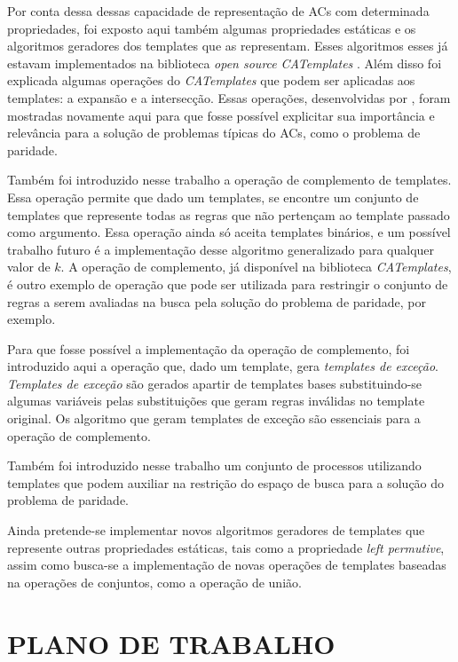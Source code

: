 \documentclass[12pt,a4paper]{article}
\let\stdsection\section
\renewcommand\section{\newpage\stdsection}
\begin{document}
Por conta dessa dessas capacidade de representação de ACs com determinada propriedades, foi exposto aqui também algumas propriedades estáticas e os algoritmos geradores dos templates que as representam. Esses algoritmos esses já estavam implementados na biblioteca \textit{open source} \textit{CATemplates} \cite{CATemplates}. Além disso foi explicada algumas operações do \textit{CATemplates} que podem ser aplicadas aos templates: a expansão e a intersecção. Essas operações, desenvolvidas por , foram mostradas novamente aqui para que fosse possível explicitar sua importância e relevância para a solução de problemas típicas do ACs, como o problema de paridade.

Também foi introduzido nesse trabalho a operação de complemento de templates. Essa operação permite que dado um templates, se encontre um conjunto de templates que represente todas as regras que não pertençam ao template passado como argumento. Essa operação ainda só aceita templates binários, e um possível trabalho futuro é a implementação desse algoritmo generalizado para qualquer valor de $k$. A operação de complemento, já disponível na biblioteca \textit{CATemplates}, é outro exemplo de operação que pode ser utilizada para restringir o conjunto de regras a serem avaliadas na busca pela solução do problema de paridade, por exemplo.

Para que fosse possível a implementação da operação de complemento, foi introduzido aqui a operação que, dado um template, gera \textit{templates de exceção}. \textit{Templates de exceção} são gerados apartir de templates bases substituindo-se algumas variáveis pelas substituições que geram regras inválidas no template original. Os algoritmo que geram templates de exceção são essenciais para a operação de complemento.

Também foi introduzido nesse trabalho um conjunto de processos utilizando templates que podem auxiliar na restrição do espaço de busca para a solução do problema de paridade.

Ainda pretende-se implementar novos algoritmos geradores de templates que represente outras propriedades estáticas, tais como a propriedade \textit{left permutive}, assim como busca-se a implementação de novas operações de templates baseadas na operações de conjuntos, como a operação de união.

\section{PLANO DE TRABALHO}
\end{document}
